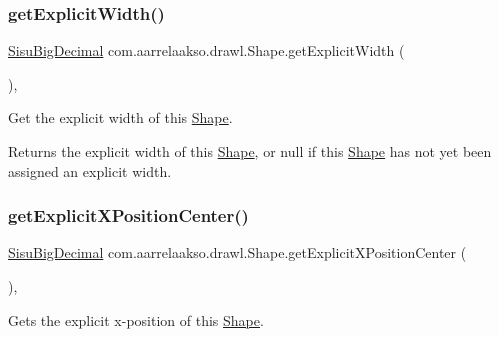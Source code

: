 \subsubsection{\texorpdfstring{get\+Explicit\+Width()}{getExplicitWidth()}}
{\footnotesize\ttfamily \hyperlink{classcom_1_1aarrelaakso_1_1drawl_1_1_sisu_big_decimal}{Sisu\+Big\+Decimal} com.\+aarrelaakso.\+drawl.\+Shape.\+get\+Explicit\+Width (\begin{DoxyParamCaption}{ }\end{DoxyParamCaption})\hspace{0.3cm}{\ttfamily [protected]}, {\ttfamily [inherited]}}



Get the explicit width of this \hyperlink{classcom_1_1aarrelaakso_1_1drawl_1_1_shape}{Shape}. 

\begin{DoxyReturn}{Returns}
the explicit width of this \hyperlink{classcom_1_1aarrelaakso_1_1drawl_1_1_shape}{Shape}, or {\ttfamily null} if this \hyperlink{classcom_1_1aarrelaakso_1_1drawl_1_1_shape}{Shape} has not yet been assigned an explicit width. 
\end{DoxyReturn}
\mbox{\label{classcom_1_1aarrelaakso_1_1drawl_1_1_shape_a079e4ec300c2ab3cd2514230b7428ea4}} 
\subsubsection{\texorpdfstring{get\+Explicit\+X\+Position\+Center()}{getExplicitXPositionCenter()}}
{\footnotesize\ttfamily \hyperlink{classcom_1_1aarrelaakso_1_1drawl_1_1_sisu_big_decimal}{Sisu\+Big\+Decimal} com.\+aarrelaakso.\+drawl.\+Shape.\+get\+Explicit\+X\+Position\+Center (\begin{DoxyParamCaption}{ }\end{DoxyParamCaption})\hspace{0.3cm}{\ttfamily [protected]}, {\ttfamily [inherited]}}



Gets the explicit x-\/position of this \hyperlink{classcom_1_1aarrelaakso_1_1drawl_1_1_shape}{Shape}. 

